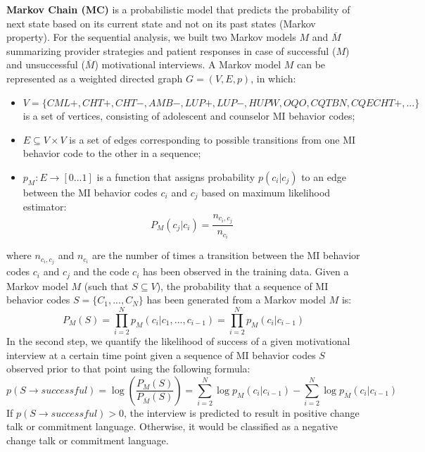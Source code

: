 \documentclass{amia_summit_2018}
\begin{document}
\textbf {Markov Chain (MC)} is a probabilistic model that predicts the probability of next state based on its current state and not on its past states (Markov property). For the sequential analysis, we built two Markov models $M$ and $\overline{M}$ summarizing provider strategies and patient responses in case of successful ($M$) and unsuccessful ($\overline{M}$) motivational interviews. A Markov model $M$ can be represented as a weighted directed graph $G = (V, E, p)$, in which:
\begin{itemize}
\item $V = \{CML+, CHT+, CHT-, AMB-, LUP+, LUP-, HUPW, OQO, CQTBN, CQECHT+,...\}$ is a set of vertices, consisting of adolescent and counselor MI behavior codes;
\item $E \subseteq V \times V$ is a set of edges corresponding to possible transitions from one MI behavior code to the other in a sequence;
\item $p_M:E\rightarrow[0...1]$ is a function that assigns probability $p(c_i|c_j)$ to an edge between the MI behavior codes $c_i$ and $c_j$ based on maximum likelihood estimator:
\begin{equation}
P_M(c_j|c_i) = \frac{n_{c_i,c_j}}{n_{c_i}}
\end{equation}
\end{itemize}
where $n_{c_i,c_j}$ and $n_{c_i}$ are the number of times a transition between the MI behavior codes $c_i$ and $c_j$ and the code $c_i$ has been observed in the training data. Given a Markov model $M$ (such that $S\subseteq V$), the probability that a sequence of MI behavior codes $S = \{C_1,...,C_N\}$ has been generated from a Markov model $M$ is:
\begin{equation}
P_M(S) = \prod_{i=2}^N p_M(c_i|c_1,\dots,c_{i-1})=\prod_{i=2}^N p_M(c_i|c_{i-1})
\end{equation}
In the second step, we quantify the likelihood of success of a given motivational interview at a certain time point given a sequence of MI behavior codes $S$ observed prior to that point using the following formula:
\begin{equation}
p(S\rightarrow successful) = \log\left(\frac{P_M(S)}{P_{\overline M}(S)}\right)= \sum_{i=2}^N \log p_M(c_i|c_{i-1})-\sum_{i=2}^N \log p_{\overline M}(c_i|c_{i-1})\label{eq:class}
\end{equation}
If $p(S\rightarrow successful) > 0 $, the interview is predicted to result in positive change talk or commitment language. Otherwise, it would be classified as a negative change talk or commitment language.
\end{document}
